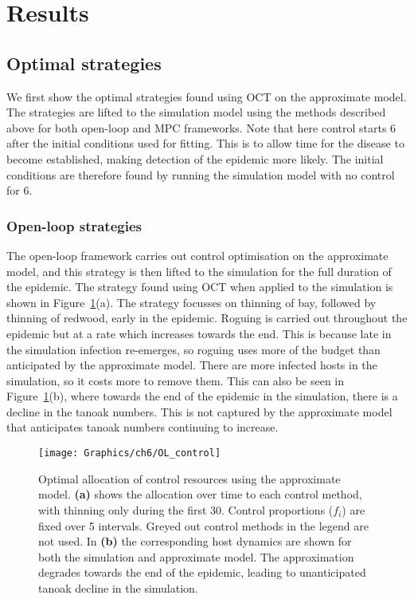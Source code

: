 \FloatBarrier
\newpage
\section{Results\label{sec:ch6:results}}

\subsection{Optimal strategies}

We first show the optimal strategies found using OCT on the approximate model. The strategies are lifted to the simulation model using the methods described above for both open-loop and MPC frameworks. Note that here control starts \SI{6}{\years} after the initial conditions used for fitting. This is to allow time for the disease to become established, making detection of the epidemic more likely. The initial conditions are therefore found by running the simulation model with no control for \SI{6}{\years}.

\subsubsection{Open-loop strategies}\label{sec:ch6:open_loop}

The open-loop framework carries out control optimisation on the approximate model, and this strategy is then lifted to the simulation for the full duration of the epidemic. The strategy found using OCT when applied to the simulation is shown in Figure~\ref{fig:ch6:ol_strat}(a). The strategy focusses on thinning of bay, followed by thinning of redwood, early in the epidemic. Roguing is carried out throughout the epidemic but at a rate which increases towards the end. This is because late in the simulation infection re-emerges, so roguing uses more of the budget than anticipated by the approximate model. There are more infected hosts in the simulation, so it costs more to remove them. This can also be seen in Figure~\ref{fig:ch6:ol_strat}(b), where towards the end of the epidemic in the simulation, there is a decline in the tanoak numbers. This is not captured by the approximate model that anticipates tanoak numbers continuing to increase.

\begin{figure}[!t]
    \begin{center}
        \texttt{[image: Graphics/ch6/OL\_control]}
        \caption[Open-loop control strategy]{Optimal allocation of control resources using the approximate model. \textbf{(a)} shows the allocation over time to each control method, with thinning only during the first \SI{30}{\years{}}. Control proportions ($f_i$) are fixed over \SI{5}{\year} intervals. Greyed out control methods in the legend are not used. In \textbf{(b)} the corresponding host dynamics are shown for both the simulation and approximate model. The approximation degrades towards the end of the epidemic, leading to unanticipated tanoak decline in the simulation.\label{fig:ch6:ol_strat}}
    \end{center}
\end{figure}

